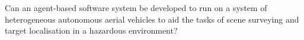 Can an agent-based software system be developed to run on a system of heterogeneous autonomous aerial vehicles to aid the tasks of scene surveying and target localisation in a hazardous environment?